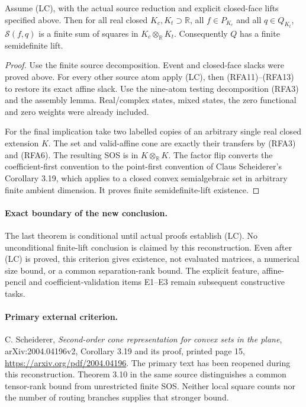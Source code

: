 \begin{theorem}
Assume (LC), with the actual source reduction and explicit closed-face
lifts specified above. Then for all real closed $K_c,K_t\supset\mathbb R$,
all $f\in P_{K_c}$ and all $q\in Q_{K_t}$,
$\mathscr S(f,q)$ is a finite sum of squares in
$K_c\otimes_{\mathbb R}K_t$. Consequently $Q$ has a finite
semidefinite lift.
\end{theorem}
\begin{proof}
Use the finite source decomposition. Event and closed-face slacks
were proved above. For every other source atom apply (LC), then
(RFA11)--(RFA13) to restore its exact affine slack.
Use the nine-atom testing decomposition (RFA3) and the assembly
lemma. Real/complex states, mixed states, the zero functional and
zero weights were already included.

For the final implication take two labelled copies of an arbitrary
single real closed extension $K$. The set and valid-affine cone are
exactly their transfers by (RFA3) and (RFA6). The resulting SOS is
in $K\otimes_{\mathbb R}K$. The factor flip converts the
coefficient-first convention to the point-first convention of
Claus Scheiderer's Corollary 3.19, which applies to a closed convex
semialgebraic set in arbitrary finite ambient dimension. It proves
finite semidefinite-lift existence.
\end{proof}

\paragraph{Exact boundary of the new conclusion.}
The last theorem is conditional until actual proofs establish (LC).
No unconditional finite-lift conclusion is claimed by this reconstruction.
Even after (LC) is proved, this criterion gives existence, not evaluated
matrices, a numerical size bound, or a common separation-rank bound.
The explicit feature, affine-pencil and coefficient-validation items
E1--E3 remain subsequent constructive tasks.

\paragraph{Primary external criterion.}
C. Scheiderer, \emph{Second-order cone representation for convex sets
in the plane}, arXiv:2004.04196v2, Corollary 3.19 and its proof,
printed page 15, \url{https://arxiv.org/pdf/2004.04196}.
The primary text has been reopened during this reconstruction.
Theorem 3.10 in the same source distinguishes a common tensor-rank
bound from unrestricted finite SOS. Neither local square counts nor
the number of routing branches supplies that stronger bound.

